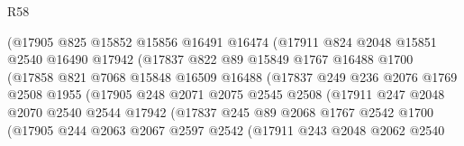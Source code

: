 \begin{lexlean}{R58}
\begin{coremodule}
                        (@17905
                          @825
                          @15852
                          @15856
                          @16491
                          @16474
                          (@17911
                            @824
                            @2048
                            @15851
                            @2540
                            @16490
                            @17942
                            (@17837
                              @822
                              @89
                              @15849
                              @1767
                              @16488
                              @1700
                              (@17858
                                @821
                                @7068
                                @15848
                                @16509
                                @16488
                                (@17837
                                  @249
                                  @236
                                  @2076
                                  @1769
                                  @2508
                                  @1955
                                  (@17905
                                    @248
                                    @2071
                                    @2075
                                    @2545
                                    @2508
                                    (@17911
                                      @247
                                      @2048
                                      @2070
                                      @2540
                                      @2544
                                      @17942
                                      (@17837
                                        @245
                                        @89
                                        @2068
                                        @1767
                                        @2542
                                        @1700
                                        (@17905
                                          @244
                                          @2063
                                          @2067
                                          @2597
                                          @2542
                                          (@17911
                                            @243
                                            @2048
                                            @2062
                                            @2540

\end{coremodule}
\end{lexlean}
